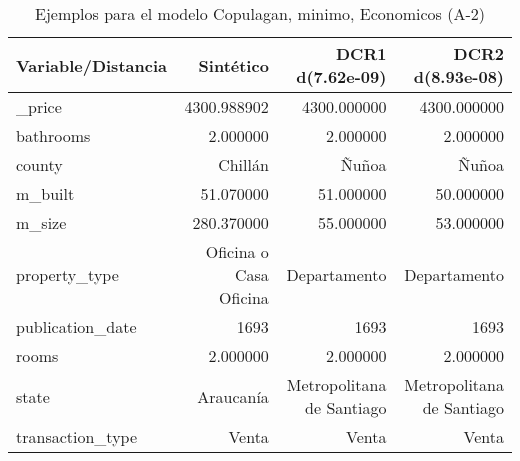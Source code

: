 \begin{table}[H]
\centering
\fontsize{10}{14}\selectfont
\caption{Ejemplos para el modelo Copulagan, minimo, Economicos (A-2)}
\label{table-example-economicos-a-2-copulagan-min}
\begin{tabular}{|l|r|r|r|}
\hline
\rowcolor[gray]{0.8}
Variable/Distancia & Sintético & DCR1 d(7.62e-09) & DCR2 d(8.93e-08) \\
\hline \_price & \cellcolor[rgb]{0.9, 0.54, 0.52} 4300.988902 & 4300.000000 & 4300.000000 \\
\hline bathrooms & \cellcolor[rgb]{0.9, 0.54, 0.52} 2.000000 & \cellcolor[rgb]{0.9, 0.54, 0.52} 2.000000 & \cellcolor[rgb]{0.9, 0.54, 0.52} 2.000000 \\
\hline county & \cellcolor[rgb]{0.9, 0.54, 0.52} Chillán & Ñuñoa & Ñuñoa \\
\hline m\_built & \cellcolor[rgb]{0.9, 0.54, 0.52} 51.070000 & 51.000000 & 50.000000 \\
\hline m\_size & \cellcolor[rgb]{0.9, 0.54, 0.52} 280.370000 & 55.000000 & 53.000000 \\
\hline property\_type & \cellcolor[rgb]{0.9, 0.54, 0.52} Oficina o Casa Oficina & Departamento & Departamento \\
\hline publication\_date & \cellcolor[rgb]{0.9, 0.54, 0.52} 1693 & \cellcolor[rgb]{0.9, 0.54, 0.52} 1693 & \cellcolor[rgb]{0.9, 0.54, 0.52} 1693 \\
\hline rooms & \cellcolor[rgb]{0.9, 0.54, 0.52} 2.000000 & \cellcolor[rgb]{0.9, 0.54, 0.52} 2.000000 & \cellcolor[rgb]{0.9, 0.54, 0.52} 2.000000 \\
\hline state & \cellcolor[rgb]{0.9, 0.54, 0.52} Araucanía & Metropolitana de Santiago & Metropolitana de Santiago \\
\hline transaction\_type & \cellcolor[rgb]{0.9, 0.54, 0.52} Venta & \cellcolor[rgb]{0.9, 0.54, 0.52} Venta & \cellcolor[rgb]{0.9, 0.54, 0.52} Venta \\
\hline
\end{tabular}
\end{table}
